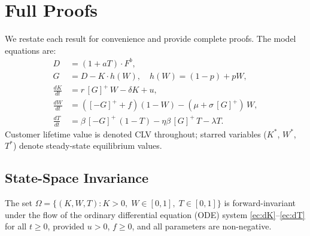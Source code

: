 \documentclass[msom,dblanonrev]{informs4}
\newcommand{\Gp}{[G]^{+}}
\newcommand{\Gm}{[-G]^{+}}
\begin{document}



%


\maketitle

\section{Full Proofs}\label{sec:ec:proofs}

We restate each result for convenience and provide complete proofs. The model equations are:
\begin{align}
D &= (1 + aT) \cdot F^b, \label{ec:demand} \\
G &= D - K \cdot h(W), \quad h(W) = (1-p) + pW, \label{ec:gap} \\
\frac{dK}{dt} &= r\,\Gp\, W - \delta K + u, \label{ec:dK} \\
\frac{dW}{dt} &= (\Gm + f)(1-W) - (\mu + \sigma\,\Gp)\,W, \label{ec:dW} \\
\frac{dT}{dt} &= \beta\,\Gm\,(1-T) - \eta\beta\,\Gp\, T - \lambda T. \label{ec:dT}
\end{align}
Customer lifetime value is denoted CLV throughout; starred variables ($K^*$, $W^*$, $T^*$) denote steady-state equilibrium values.

\subsection{State-Space Invariance}\label{sec:ec:invariance}

\begin{lemma}\label{lem:invariance}
The set $\Omega = \{(K, W, T) : K > 0,\; W \in [0,1],\; T \in [0,1]\}$ is forward-invariant under the flow of the ordinary differential equation (ODE) system \eqref{ec:dK}--\eqref{ec:dT} for all $t \geq 0$, provided $u > 0$, $f \geq 0$, and all parameters are non-negative.
\end{lemma}
\end{document}
